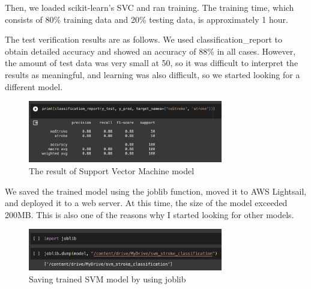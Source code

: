 Then, we loaded scikit-learn's SVC and ran training. The training time, which consists of 80\% training data and 20\% testing data, is approximately 1 hour.


The test verification results are as follows. We used classification\_report to obtain detailed accuracy and showed an accuracy of 88\% in all cases. However, the amount of test data was very small at 50, so it was difficult to interpret the results as meaningful, and learning was also difficult, so we started looking for a different model.

\begin{figure}[h]
    \centering
    \includegraphics[width=8.5cm]{images/svm_result.png}
    \caption{The result of Support Vector Machine model}
    \label{fig:enter-label}
\end{figure}


We saved the trained model using the joblib function, moved it to AWS Lightsail, and deployed it to a web server. At this time, the size of the model exceeded 200MB. This is also one of the reasons why I started looking for other models.

\begin{figure}[h]
    \centering
    \includegraphics[width=8.5cm]{images/svm_save.png}
    \caption{Saving trained SVM model by using joblib}
    \label{fig:enter-label}
\end{figure}


